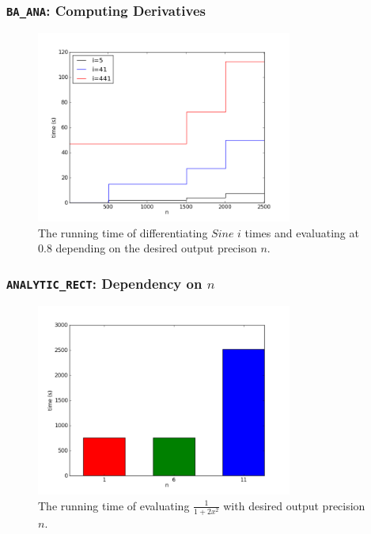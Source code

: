 \documentclass[xcolor=pdftex,dvipsnames,table]{beamer}
\newcommand{\code}[1]{\texttt{#1}}
\begin{document}
\begin{frame}
\frametitle{\code{BA\_ANA}: Computing Derivatives}
\begin{figure}[h!]
\centering
\includegraphics[width=0.75\textwidth]{ddxbana_n}
  \caption{The running time of differentiating $Sine$ $i$ times and evaluating at $0.8$ depending on the desired output precison $n$.}
\end{figure}
\end{frame}
\begin{frame}
\frametitle{\code{ANALYTIC\_RECT}: Dependency on $n$}
\begin{figure}[h!]
\centering
\includegraphics[width=0.75\textwidth]{dep_on_n}
  \caption{The running time of evaluating $\frac{1}{1+2x^2}$ with desired output precision $n$.}
\end{figure}
\end{frame}
\end{document}
